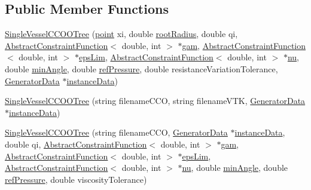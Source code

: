 \subsection*{Public Member Functions}
\begin{DoxyCompactItemize}
\item 
\hyperlink{class_single_vessel_c_c_o_o_tree_a9752ea9e6e8454e2671b6f2247615d7a}{Single\+Vessel\+C\+C\+O\+O\+Tree} (\hyperlink{structpoint}{point} xi, double \hyperlink{class_single_vessel_c_c_o_o_tree_a92984c132be3e2eaed34adfc261afa48}{root\+Radius}, double qi, \hyperlink{class_abstract_constraint_function}{Abstract\+Constraint\+Function}$<$ double, int $>$ $\ast$\hyperlink{class_abstract_object_c_c_o_tree_aad315b93744637e18153c4434dac067d}{gam}, \hyperlink{class_abstract_constraint_function}{Abstract\+Constraint\+Function}$<$ double, int $>$ $\ast$\hyperlink{class_abstract_object_c_c_o_tree_a62d3e1ff7e74a6236422273f58fc6012}{eps\+Lim}, \hyperlink{class_abstract_constraint_function}{Abstract\+Constraint\+Function}$<$ double, int $>$ $\ast$\hyperlink{class_abstract_object_c_c_o_tree_a92e6b6d1a2fac7331eee34fb28158828}{nu}, double \hyperlink{class_abstract_object_c_c_o_tree_a254b7d92f417613be6019031a0afb63d}{min\+Angle}, double \hyperlink{class_abstract_object_c_c_o_tree_ae7215e6237e4d04625a0c96be9f3578d}{ref\+Pressure}, double resistance\+Variation\+Tolerance, \hyperlink{class_generator_data}{Generator\+Data} $\ast$\hyperlink{class_abstract_object_c_c_o_tree_aca7aecbd89dadc46dd9dce14cfde31e1}{instance\+Data})
\item 
\hyperlink{class_single_vessel_c_c_o_o_tree_af4467025999a821772358cb1793eea9c}{Single\+Vessel\+C\+C\+O\+O\+Tree} (string filename\+C\+CO, string filename\+V\+TK, \hyperlink{class_generator_data}{Generator\+Data} $\ast$\hyperlink{class_abstract_object_c_c_o_tree_aca7aecbd89dadc46dd9dce14cfde31e1}{instance\+Data})
\item 
\hyperlink{class_single_vessel_c_c_o_o_tree_a005a1e0f20a530e4b4ccdd258cd13827}{Single\+Vessel\+C\+C\+O\+O\+Tree} (string filename\+C\+CO, \hyperlink{class_generator_data}{Generator\+Data} $\ast$\hyperlink{class_abstract_object_c_c_o_tree_aca7aecbd89dadc46dd9dce14cfde31e1}{instance\+Data}, double qi, \hyperlink{class_abstract_constraint_function}{Abstract\+Constraint\+Function}$<$ double, int $>$ $\ast$\hyperlink{class_abstract_object_c_c_o_tree_aad315b93744637e18153c4434dac067d}{gam}, \hyperlink{class_abstract_constraint_function}{Abstract\+Constraint\+Function}$<$ double, int $>$ $\ast$\hyperlink{class_abstract_object_c_c_o_tree_a62d3e1ff7e74a6236422273f58fc6012}{eps\+Lim}, \hyperlink{class_abstract_constraint_function}{Abstract\+Constraint\+Function}$<$ double, int $>$ $\ast$\hyperlink{class_abstract_object_c_c_o_tree_a92e6b6d1a2fac7331eee34fb28158828}{nu}, double \hyperlink{class_abstract_object_c_c_o_tree_a254b7d92f417613be6019031a0afb63d}{min\+Angle}, double \hyperlink{class_abstract_object_c_c_o_tree_ae7215e6237e4d04625a0c96be9f3578d}{ref\+Pressure}, double viscosity\+Tolerance)

\end{DoxyCompactItemize}
